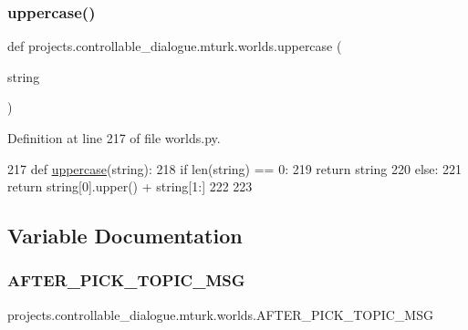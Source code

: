\subsubsection{\texorpdfstring{uppercase()}{uppercase()}}
{\footnotesize\ttfamily def projects.\+controllable\+\_\+dialogue.\+mturk.\+worlds.\+uppercase (\begin{DoxyParamCaption}\item[{}]{string }\end{DoxyParamCaption})}



Definition at line 217 of file worlds.\+py.


\begin{DoxyCode}
217 \textcolor{keyword}{def }\hyperlink{namespaceprojects_1_1controllable__dialogue_1_1mturk_1_1worlds_a661f3cc70180bbd2379e66e5844f7900}{uppercase}(string):
218     \textcolor{keywordflow}{if} len(string) == 0:
219         \textcolor{keywordflow}{return} string
220     \textcolor{keywordflow}{else}:
221         \textcolor{keywordflow}{return} string[0].upper() + string[1:]
222 
223 
\end{DoxyCode}


\subsection{Variable Documentation}
\mbox{\label{namespaceprojects_1_1controllable__dialogue_1_1mturk_1_1worlds_ad1b5e89172f176651800aa7778efb59c}} 
\subsubsection{\texorpdfstring{A\+F\+T\+E\+R\+\_\+\+P\+I\+C\+K\+\_\+\+T\+O\+P\+I\+C\+\_\+\+M\+SG}{AFTER\_PICK\_TOPIC\_MSG}}
{\footnotesize\ttfamily projects.\+controllable\+\_\+dialogue.\+mturk.\+worlds.\+A\+F\+T\+E\+R\+\_\+\+P\+I\+C\+K\+\_\+\+T\+O\+P\+I\+C\+\_\+\+M\+SG}



